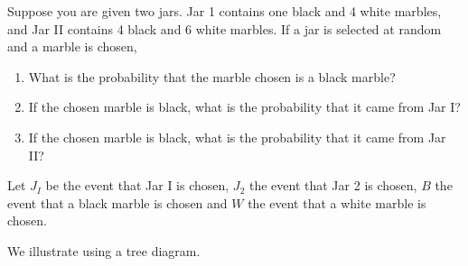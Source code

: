 \begin{example}
    Suppose you are given two jars. Jar 1 contains one black and 4 white marbles, and Jar II contains 4 black and 6 white marbles. If a jar is selected at random and a marble is chosen,
    \begin{enumerate}
        \item What is the probability that the marble chosen is a black marble?
        \item If the chosen marble is black, what is the probability that it came from Jar I?
        \item If the chosen marble is black, what is the probability that it came from Jar II?
    \end{enumerate}
\end{example}
\begin{solution}
    Let \( J_I \) be the event that Jar I is chosen, \( J_{2} \) the event that Jar 2 is chosen, \( B \) the event that a black marble is chosen and \( W \) the event that a white marble is chosen.

    We illustrate using a tree diagram.
    \begin{center}
\end{center}
\end{solution}
